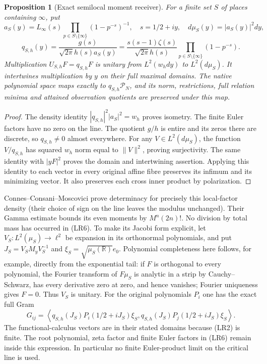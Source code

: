 \documentclass[11pt]{article}
\newtheorem{proposition}[theorem]{Proposition}
\theoremstyle{remark}\newtheorem{remark}[theorem]{Remark}
\begin{document}
\begin{proposition}[Exact semilocal moment receiver]
For a finite set $S$ of places containing $\infty$, put
\[
 a_S(y)=L_\infty(s)\prod_{p\in S\setminus\{\infty\}}
 (1-p^{-s})^{-1},\quad s=1/2+iy,\quad d\mu_S(y)=|a_S(y)|^2dy,
\]
\[
 q_{S,h}(y)=\frac{g(s)}{\sqrt{2\pi}h(s)a_S(y)}
 =\frac{s(s-1)\zeta(s)}{\sqrt{2\pi}h(s)}
 \prod_{p\in S\setminus\{\infty\}}(1-p^{-s}).\tag{LR6}
\]
Multiplication $U_{S,h}F=q_{S,h}F$ is unitary from
$L^2(w_hdy)$ to $L^2(d\mu_S)$. It intertwines multiplication by $y$
on their full maximal domains. The native polynomial space maps exactly
to $q_{S,h}\mathcal P_N$, and its norm, restrictions, full relation
minima and attained observation quotients are preserved under this map.
\end{proposition}
\begin{proof}
The density identity $|q_{S,h}|^2|a_S|^2=w_h$ proves isometry.
The finite Euler factors have no zero on the line. The quotient $g/h$
is entire and its zeros there are discrete, so $q_{S,h}\ne0$ almost
everywhere. For any $V\in L^2(d\mu_S)$, the function $V/q_{S,h}$
has squared $w_h$ norm equal to $\|V\|^2$, proving surjectivity.
The same identity with $|yF|^2$ proves the domain and intertwining
assertion. Applying this identity to each vector in every original
affine fibre preserves its infimum and its minimizing vector.
It also preserves each cross inner product by polarization.
\end{proof}

Connes--Consani--Moscovici \cite[\S3.2, Proposition 3.1]{CCM}
prove determinacy for precisely this local-factor density (their
choice of sign on the line leaves the modulus unchanged).
Their Gamma estimate bounds its even moments by $M^n(2n)!$.
No division by total mass has occurred in (LR6). To make its Jacobi
form explicit, let $V_S:L^2(\mu_S)\longrightarrow\ell^2$ be expansion
in its orthonormal polynomials, and put
$J_S=V_SM_yV_S^{-1}$ and $\xi_S=\sqrt{\mu_S(\mathbb R)}e_0$.
Polynomial completeness here follows, for example, directly from
the exponential tail: if $F$ is orthogonal to every polynomial,
the Fourier transform of $F\mu_S$ is analytic in a strip by
Cauchy--Schwarz, has every derivative zero at zero, and hence vanishes;
Fourier uniqueness gives $F=0$. Thus $V_S$ is unitary. For the original
polynomials $P_i$ one has the exact full Gram
\[
 G_{ij}=\left\langle q_{S,h}(J_S)P_i(1/2+iJ_S)\xi_S,
 q_{S,h}(J_S)P_j(1/2+iJ_S)\xi_S\right\rangle.\tag{LR7}
\]
The functional-calculus vectors are in their stated domains because
(LR2) is finite. The root polynomial, zeta factor and finite Euler
factors in (LR6) remain inside this expression. In particular no
finite Euler-product limit on the critical line is used.
\end{document}
